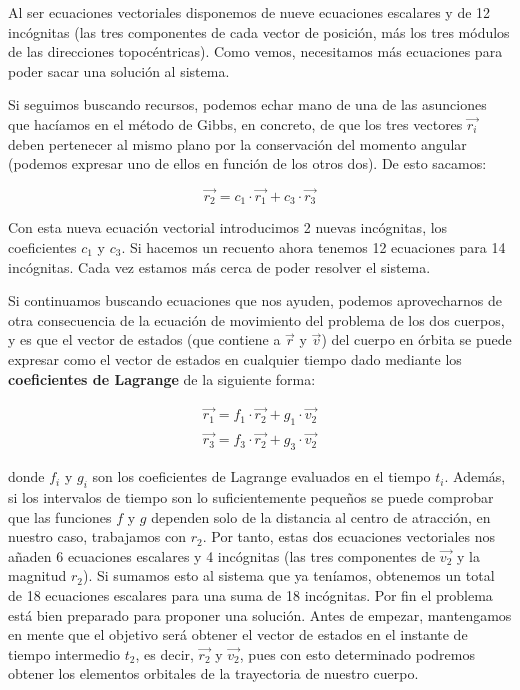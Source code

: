 \documentclass{article}
\numberwithin{equation}{section}
\begin{document}
Al ser ecuaciones vectoriales disponemos de nueve ecuaciones escalares y de 12 incógnitas (las tres componentes de cada vector de posición, más los tres módulos de las direcciones topocéntricas). Como vemos, necesitamos más ecuaciones para poder sacar una solución al sistema.\par

Si seguimos buscando recursos, podemos echar mano de una de las asunciones que hacíamos en el método de Gibbs, en concreto, de que los tres vectores $\overrightarrow{r_i}$ deben pertenecer al mismo plano por la conservación del momento angular (podemos expresar uno de ellos en función de los otros dos). De esto sacamos:

\begin{equation}
    \overrightarrow{r_2} = c_1\cdot\overrightarrow{r_1} + c_3\cdot\overrightarrow{r_3}
\end{equation}

Con esta nueva ecuación vectorial introducimos 2 nuevas incógnitas, los coeficientes $c_1$ y $c_3$. Si hacemos un recuento ahora tenemos 12 ecuaciones para 14 incógnitas. Cada vez estamos más cerca de poder resolver el sistema.\par

Si continuamos buscando ecuaciones que nos ayuden, podemos aprovecharnos de otra consecuencia de la ecuación de movimiento del problema de los dos cuerpos, y es que el vector de estados (que contiene a $\overrightarrow{r}$ y $\overrightarrow{v}$) del cuerpo en órbita se puede expresar como el vector de estados en cualquier tiempo dado mediante los \textbf{coeficientes de Lagrange} de la siguiente forma:

\begin{align}
    \overrightarrow{r_1} = f_1\cdot\overrightarrow{r_2} + g_1\cdot\overrightarrow{v_2} \\
    \overrightarrow{r_3} = f_3\cdot\overrightarrow{r_2} + g_3\cdot\overrightarrow{v_2}
\end{align}

donde $f_i$ y $g_i$ son los coeficientes de Lagrange evaluados en el tiempo $t_i$. Además, si los intervalos de tiempo son lo suficientemente pequeños se puede comprobar que las funciones $f$ y $g$ dependen solo de la distancia al centro de atracción, en nuestro caso, trabajamos con $r_2$. Por tanto, estas dos ecuaciones vectoriales nos añaden 6 ecuaciones escalares y 4 incógnitas (las tres componentes de $\overrightarrow{v_2}$ y la magnitud $r_2$). Si sumamos esto al sistema que ya teníamos, obtenemos un total de 18 ecuaciones escalares para una suma de 18 incógnitas. Por fin el problema está bien preparado para proponer una solución. Antes de empezar, mantengamos en mente que el objetivo será obtener el vector de estados en el instante de tiempo intermedio $t_2$, es decir, $\overrightarrow{r_2}$ y $\overrightarrow{v_2}$, pues con esto determinado podremos obtener los elementos orbitales de la trayectoria de nuestro cuerpo.\\
\end{document}
